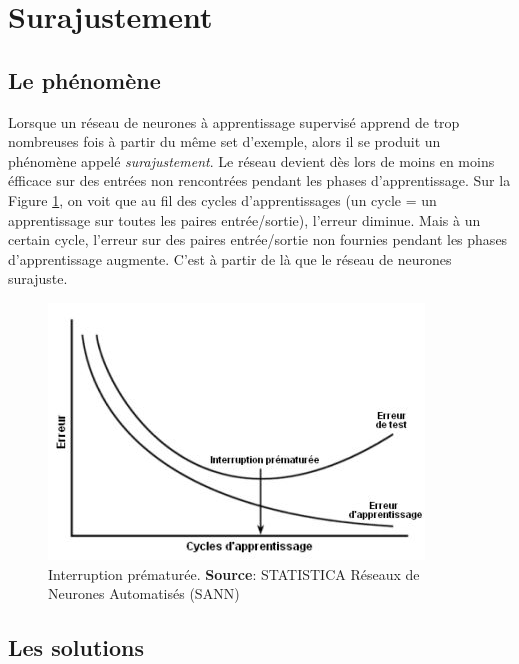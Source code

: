 \section{Surajustement}
\subsection{Le phénomène}
Lorsque un réseau de neurones à apprentissage supervisé apprend de trop nombreuses fois à partir du même set d'exemple, alors il se produit un phénomène appelé \emph{surajustement}.\cite{statistica}
Le réseau devient dès lors de moins en moins éfficace sur des entrées non rencontrées pendant les phases d'apprentissage.
Sur la Figure \ref{interruption}, on voit que au fil des cycles d'apprentissages (un cycle = un apprentissage sur toutes les paires entrée/sortie), l'erreur diminue.
Mais à un certain cycle, l'erreur sur des paires entrée/sortie non fournies pendant les phases d'apprentissage augmente.
C'est à partir de là que le réseau de neurones surajuste.
\begin{figure}
 \centering
 \includegraphics[scale=0.6]{../figures/surgeneralisation.jpg}
 \caption{Interruption prématurée. \textbf{Source}: STATISTICA Réseaux de Neurones Automatisés (SANN)\cite{statistica}}
 \label{interruption}
\end{figure}
\subsection{Les solutions}

